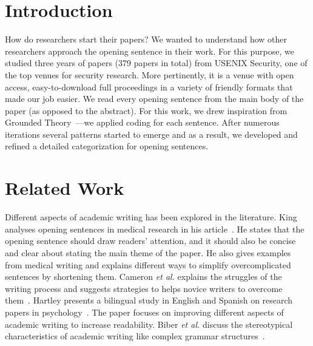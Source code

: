\documentclass[sigconf]{acmart}
\newcommand{\etal}{\textit{et al.}\xspace}
\begin{document}
	
	\maketitle
	\section{Introduction}
	How do researchers start their papers? We wanted to understand how other researchers approach the opening sentence in their work. For this purpose, we studied three years of papers (379 papers in total) from USENIX Security, one of the top venues for security research. More pertinently, it is a venue with open access, easy-to-download full proceedings in a variety of friendly formats that made our job easier. We read every opening sentence from the main body of the paper (as opposed to the abstract). For this work, we drew inspiration from Grounded Theory~\cite{glaser1968discovery}---we applied coding for each sentence. After numerous iterations several patterns started to emerge and as a result, we developed and refined a detailed categorization for opening sentences. 
	
	\section{Related Work}
	Different aspects of academic writing has been explored in the literature. King analyses opening sentences in medical research in his article~\cite{king1967opening}. He states that the opening sentence should draw readers' attention, and it should also be concise and clear about stating the main theme of the paper. He also gives examples from medical writing and explains different ways to simplify overcomplicated sentences by shortening them. Cameron \etal explains the struggles of the writing process and suggests strategies to helps novice writers to overcome them~\cite{cameron2009demystifying}. Hartley presents a bilingual study in English and Spanish on research papers in psychology~\cite{hartley2012new}. The paper focuses on improving different aspects of academic writing to increase readability. Biber \etal discuss the stereotypical characteristics of academic writing like complex grammar structures~\cite{biber2010challenging}.
	
\end{document}
